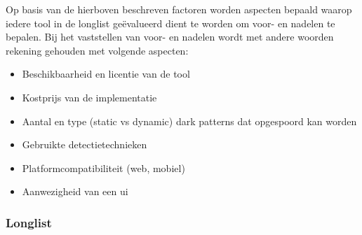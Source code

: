 \vspace{1em}

Op basis van de hierboven beschreven factoren worden aspecten bepaald waarop iedere tool in de longlist geëvalueerd dient te worden om voor- en nadelen te bepalen. Bij het vaststellen van voor- en nadelen wordt met andere woorden rekening gehouden met volgende aspecten:

\begin{itemize}
    \item Beschikbaarheid en licentie van de tool
    \item Kostprijs van de implementatie
    \item Aantal en type (static vs dynamic) dark patterns dat opgespoord kan worden
    \item Gebruikte detectietechnieken
    \item Platformcompatibiliteit (web, mobiel)
    \item Aanwezigheid van een \acrlong{ui}
\end{itemize}

\newpage

\subsubsection{Longlist}
\label{subsubsec:longlist}

